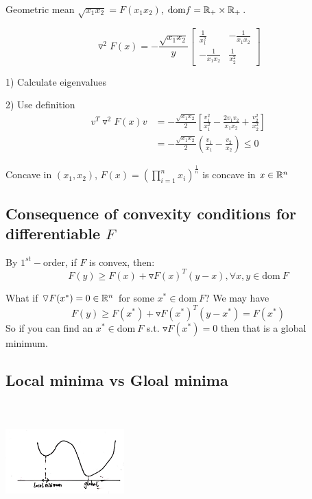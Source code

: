 \begin{example}
	Geometric mean $\sqrt{x_1x_2} = F(x_1x_2)$, $\text{dom}f = \mathbb{R}_+ \times \mathbb{R}_+$.
	
	\begin{equation*}
	\triangledown^2F(x) = -\frac{\sqrt{x_1x_2}}{y}\begin{bmatrix}
	\frac{1}{x^2_1} & -\frac{1}{x_1x_2}\\
	-\frac{1}{x_1x_2} & \frac{1}{x^2_2}
	\end{bmatrix}
	\end{equation*}
	
	1) Calculate eigenvalues
	
	2) Use definition
	\begin{align*}
	v^T\triangledown^2F(x)v &= -\frac{\sqrt{x_1x_2}}{2}[\frac{v_1^2}{x_1^2} - \frac{2v_1v_2}{x_1x_2} + \frac{v_2^2}{x^2_2}]\\
	&= -\frac{\sqrt{x_1x_2}}{2}(\frac{v_1}{x_1} -\frac{v_2}{x_2}) \leq 0
	\end{align*}
	
	Concave in $(x_1, x_2)$, $F(x) = (\prod^n_{i=1}x_i)^{\frac{1}{n}}$ is concave in $x\in \mathbb{R}^n$
\end{example}

\subsection{Consequence of convexity conditions for differentiable $F$}

\quad By $1^{st}-$order, if $F$ is convex, then:
$$F(y)\geq F(x) + \triangledown F(x)^T(y-x), \forall x,y\in \text{dom}\ F$$

What if $\triangledown F(x^*) = 0 \in \mathbb{R}^n$ for some $x^*\in \text{dom}\ F$? We may have
$$F(y)\geq F(x^*) + \triangledown F(x^*)^T(y-x^*)=F(x^*) $$
So if you can find an $x^*\in \text{dom}\ F$ s.t. $\triangledown F(x^*) = 0$ then that is a global minimum.





\subsection{Local minima vs Gloal minima}

\begin{marginfigure}
	\centering
	\includegraphics[width=1.8in,height=1.8in]{figures/ch08/figure1111_1.png}
\end{marginfigure}

